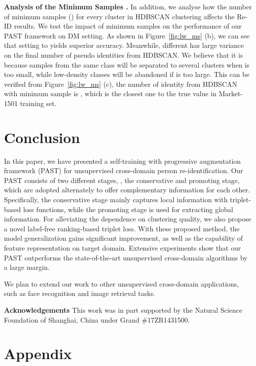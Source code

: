 \documentclass[10pt,twocolumn,letterpaper]{article}
\begin{document}
\textbf{Analysis of the Minimum Samples .}
In addition, we analyse how the number of minimum samples () for every cluster in HDBSCAN clustering affects the Re-ID results. 
We test the impact of  minimum samples on the performance of our PAST framework on DM setting. 
As shown in Figure~\ref{fig:lw_ms} (b), we can see that setting  to  yields superior accuracy. 
Meanwhile, different  has large variance on the final number of pseudo identities from HDBSCAN. We believe that it is because samples from the same class will be separated to several clusters when  is too small, while low-density classes will be abandoned if  is too large. 
This can be verified from Figure~\ref{fig:lw_ms} (c), the number of identity from HDBSCAN with minimum sample  is \textbf{}, which is the closest one to the true value  in Market-1501 training set.


\section{Conclusion}
In this paper, we have presented a self-training with progressive augmentation framework (PAST) for unsupervised cross-domain person re-identification. Our PAST consists of two different stages, \ie, the conservative and promoting stage, which are adopted alternately to offer complementary information for each other. 
Specifically, the conservative stage mainly captures local information with triplet-based loss functions, while the promoting stage is used for extracting global information. 
For alleviating the dependence on clustering quality, we also propose a novel label-free ranking-based triplet loss. 
With these proposed method, the model generalization gains significant improvement, as well as the capability of feature representation on target domain. 
Extensive experiments show that our PAST outperforms the state-of-the-art unsupervised cross-domain algorithms by a large margin.

We plan to extend our work to other unsupervised cross-domain applications, such as face recognition 
and image retrieval tasks.


\textbf{Acknowledgements}
This work was in part supported by the Natural Science Foundation of Shanghai, China under Grand \#17ZR1431500.







{\small


}

\section*{Appendix}
\setcounter{section}{0} 
\end{document}
